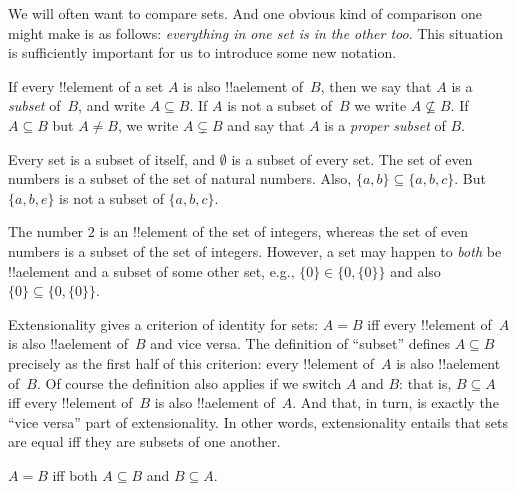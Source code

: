 \documentclass[../../../include/open-logic-section]{subfiles}
\begin{document}

\begin{explain}
We will often want to compare sets. And one obvious kind of comparison
one might make is as follows: \emph{everything in one set is in the
other too}. This situation is sufficiently important for us to
introduce some new notation.
\end{explain}

\begin{defn}[Subset]
If every !!{element} of a set $A$ is also !!a{element} of~$B$, then we
say that $A$ is a \emph{subset} of~$B$, and write $A \subseteq B$. If
$A$ is not a subset of~$B$ we write $A \not\subseteq B$.
If $A \subseteq B$ but $A \neq B$, we write $A \subsetneq B$ and say
that $A$ is a \emph{proper subset} of $B$.
\end{defn}

\begin{ex}
Every set is a subset of itself, and $\emptyset$ is a subset of every
set. The set of even numbers is a subset of the set of natural
numbers. Also, $\{ a, b \} \subseteq \{ a, b, c \}$. But $\{ a, b, e
\}$ is not a subset of $\{ a, b, c \}$.
\end{ex}

\begin{ex}
The number $2$ is an !!{element} of the set of integers, whereas the
set of even numbers is a subset of the set of integers. However, a set
may happen to \emph{both} be !!a{element} and a subset of some other
set, e.g., $\{0\} \in \{0, \{0\}\}$ and also $\{0\} \subseteq \{0,
\{0\}\}$.
\end{ex}

Extensionality gives a criterion of identity for sets: $A = B$ iff
every !!{element} of~$A$ is also !!a{element} of~$B$ and vice versa.
The definition of ``subset'' defines $A \subseteq B$ precisely as the
first half of this criterion: every !!{element} of~$A$ is also
!!a{element} of~$B$. Of course the definition also applies if we
switch $A$ and $B$: that is, $B \subseteq A$ iff every !!{element}
of~$B$ is also !!a{element} of~$A$. And that, in turn, is exactly the
``vice versa'' part of extensionality. In other words, extensionality
entails that sets are equal iff they are subsets of one another.

\begin{prop}
$A = B$ iff both $A \subseteq B$ and $B \subseteq A$.
\end{prop}
\end{document}
